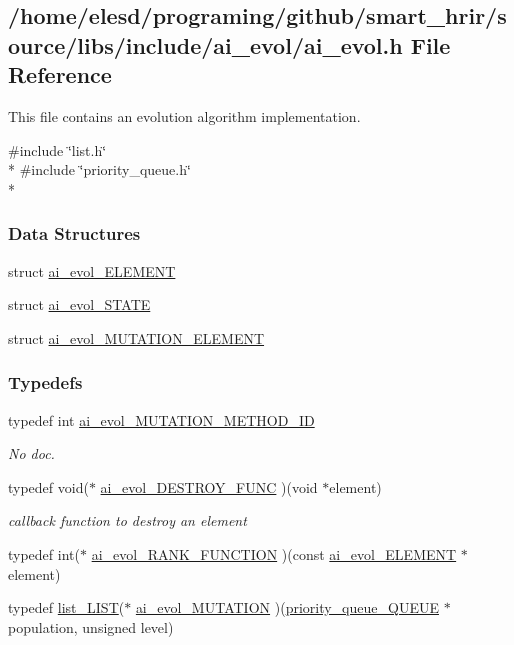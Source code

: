 \hypertarget{a00008}{\subsection{/home/elesd/programing/github/smart\-\_\-hrir/source/libs/include/ai\-\_\-evol/ai\-\_\-evol.h File Reference}
\label{a00008}
}


This file contains an evolution algorithm implementation.  


{\ttfamily \#include \char`\"{}list.\-h\char`\"{}}\\*
{\ttfamily \#include \char`\"{}priority\-\_\-queue.\-h\char`\"{}}\\*
\subsubsection*{Data Structures}
\begin{DoxyCompactItemize}
\item 
struct \hyperlink{a00001}{ai\-\_\-evol\-\_\-\-E\-L\-E\-M\-E\-N\-T}
\item 
struct \hyperlink{a00003}{ai\-\_\-evol\-\_\-\-S\-T\-A\-T\-E}
\item 
struct \hyperlink{a00002}{ai\-\_\-evol\-\_\-\-M\-U\-T\-A\-T\-I\-O\-N\-\_\-\-E\-L\-E\-M\-E\-N\-T}
\end{DoxyCompactItemize}
\subsubsection*{Typedefs}
\begin{DoxyCompactItemize}
\item 
\hypertarget{a00008_a718dd70dd5597e1668aeeb7cd49fed03}{typedef int \hyperlink{a00008_a718dd70dd5597e1668aeeb7cd49fed03}{ai\-\_\-evol\-\_\-\-M\-U\-T\-A\-T\-I\-O\-N\-\_\-\-M\-E\-T\-H\-O\-D\-\_\-\-I\-D}}\label{a00008_a718dd70dd5597e1668aeeb7cd49fed03}

\begin{DoxyCompactList}\small\item\em No doc. \end{DoxyCompactList}\item 
typedef void($\ast$ \hyperlink{a00008_a6710253499441c289fb8751c83221e38}{ai\-\_\-evol\-\_\-\-D\-E\-S\-T\-R\-O\-Y\-\_\-\-F\-U\-N\-C} )(void $\ast$element)
\begin{DoxyCompactList}\small\item\em callback function to destroy an element \end{DoxyCompactList}\item 
typedef int($\ast$ \hyperlink{a00008_a40f90c3ffcebe63f84cf844eea9167c5}{ai\-\_\-evol\-\_\-\-R\-A\-N\-K\-\_\-\-F\-U\-N\-C\-T\-I\-O\-N} )(const \hyperlink{a00001}{ai\-\_\-evol\-\_\-\-E\-L\-E\-M\-E\-N\-T} $\ast$element)
\item 
typedef \hyperlink{a00004}{list\-\_\-\-L\-I\-S\-T}($\ast$ \hyperlink{a00008_a396a21836c00e192def7ee47518bd001}{ai\-\_\-evol\-\_\-\-M\-U\-T\-A\-T\-I\-O\-N} )(\hyperlink{a00007}{priority\-\_\-queue\-\_\-\-Q\-U\-E\-U\-E} $\ast$population, unsigned level)
\end{DoxyCompactItemize}

